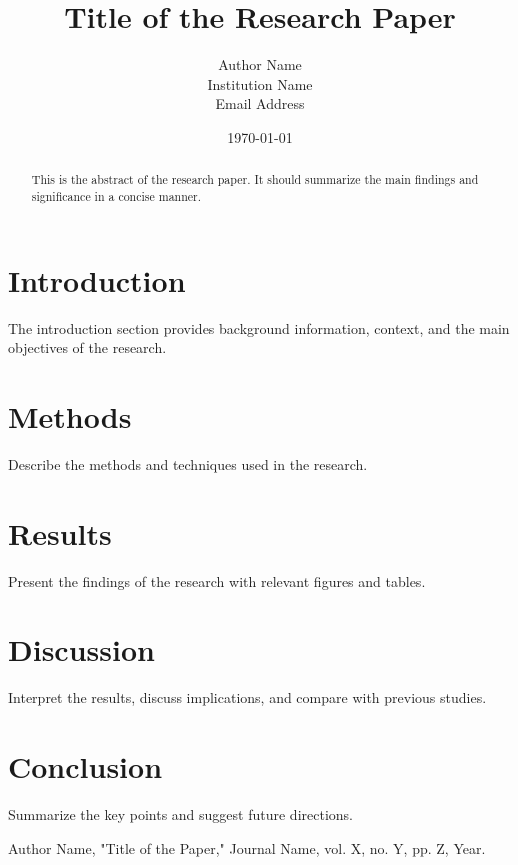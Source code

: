 \documentclass[12pt]{article}
\title{Title of the Research Paper}
\author{Author Name \\ Institution Name \\ Email Address}
\date{\today}
\begin{document}
\maketitle

\begin{abstract}
    This is the abstract of the research paper. It should summarize the main findings and significance in a concise manner.
\end{abstract}

\section{Introduction}
The introduction section provides background information, context, and the main objectives of the research.

\section{Methods}
Describe the methods and techniques used in the research.

\section{Results}
Present the findings of the research with relevant figures and tables.

\section{Discussion}
Interpret the results, discuss implications, and compare with previous studies.

\section{Conclusion}
Summarize the key points and suggest future directions.

\begin{thebibliography}{99}
     Author Name, "Title of the Paper," Journal Name, vol. X, no. Y, pp. Z, Year.
\end{thebibliography}
\end{document}
